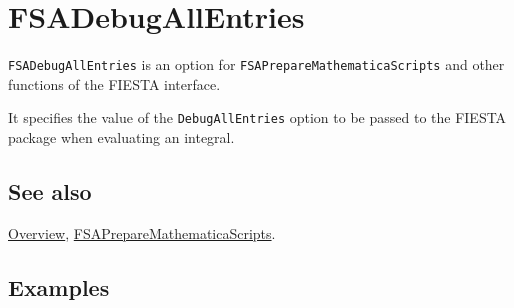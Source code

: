 \documentclass[../FeynHelpersManual.tex]{subfiles}
\begin{document}
\hypertarget{fsadebugallentries}{
\section{FSADebugAllEntries}\label{fsadebugallentries}}

\texttt{FSADebugAllEntries} is an option for
\texttt{FSAPrepareMathematicaScripts} and other functions of the FIESTA
interface.

It specifies the value of the \texttt{DebugAllEntries} option to be
passed to the FIESTA package when evaluating an integral.

\subsection{See also}

\hyperlink{toc}{Overview},
\hyperlink{fsapreparemathematicascripts}{FSAPrepareMathematicaScripts}.

\subsection{Examples}
\end{document}
